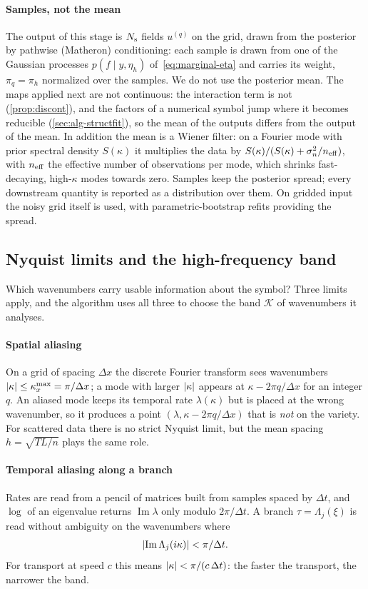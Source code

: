 \paragraph{Samples, not the mean}
The output of this stage is $N_{\mathrm s}$ fields $u^{(q)}$ on the grid, drawn from the posterior by pathwise
(Matheron) conditioning: each sample is drawn from one of the Gaussian processes $p(f\mid y,\eta_h)$
of~\eqref{eq:marginal-eta} and carries its weight, $\pi_q=\pi_h$ normalized over the samples. We do not use the posterior mean. The maps applied next
are not continuous: the interaction term is not (\cref{prop:discont}), and the factors of a numerical symbol jump
where it becomes reducible (\cref{sec:alg-structfit}), so the mean of the outputs differs from the output of the mean. In addition the mean is a Wiener filter: on a Fourier mode with
prior spectral density $S(\kappa)$ it multiplies the data by $S(\kappa)/(S(\kappa)+\sigma_{n}^2/n_{\rm eff})$, with $n_{\rm eff}$ the effective number of observations per mode,
which shrinks fast-decaying, high-$\kappa$ modes towards zero. Samples keep the posterior spread;
every downstream quantity is reported as a distribution over them. On gridded input the noisy grid
itself is used, with parametric-bootstrap refits providing the spread.

\subsection{Nyquist limits and the high-frequency band}\label{sec:nyquist}
Which wavenumbers carry usable information about the symbol? Three limits apply, and the algorithm
uses all three to choose the band $\mathcal K$ of wavenumbers it analyses.

\paragraph{Spatial aliasing} On a grid of spacing $\Delta x$ the discrete Fourier transform sees
wavenumbers $\lvert\kappa\rvert\le\kappa_x^{\max}=\pi/\Delta x$; a mode with larger $\lvert\kappa\rvert$ appears at
$\kappa-2\pi q/\Delta x$ for an integer $q$. An aliased mode keeps its temporal rate $\lambda(\kappa)$
but is placed at the wrong wavenumber, so it produces a point $(\lambda,\kappa-2\pi q/\Delta x)$ that is
\emph{not} on the variety. For scattered data there is no strict Nyquist limit, but the mean spacing
$h=\sqrt{TL/n}$ plays the same role.

\paragraph{Temporal aliasing along a branch} Rates are read from a pencil of matrices built from
samples spaced by $\Delta t$, and $\log$ of an eigenvalue returns $\operatorname{Im}\lambda$ only modulo
$2\pi/\Delta t$. A branch $\tau=\Lambda_j(\xi)$ is read without ambiguity on the wavenumbers where
\begin{equation}\label{eq:nyq-t}
  \lvert\operatorname{Im}\Lambda_j(i\kappa)\rvert<\pi/\Delta t .
\end{equation}
For transport at speed $c$ this means $\lvert\kappa\rvert<\pi/(c\,\Delta t)$: the faster the transport, the
narrower the band.

